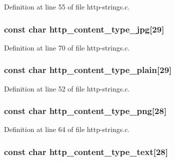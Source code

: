 Definition at line 55 of file http-\/strings.c.

\hypertarget{http-strings_8h_a34bd96a209a37f4b16744500510c50a0}{
\subsubsection[{http\_\-content\_\-type\_\-jpg}]{\setlength{\rightskip}{0pt plus 5cm}const char {\bf http\_\-content\_\-type\_\-jpg}\mbox{[}29\mbox{]}}}
\label{http-strings_8h_a34bd96a209a37f4b16744500510c50a0}


Definition at line 70 of file http-\/strings.c.

\hypertarget{http-strings_8h_a93ca46951cc4842f1abde782f3d2358d}{
\subsubsection[{http\_\-content\_\-type\_\-plain}]{\setlength{\rightskip}{0pt plus 5cm}const char {\bf http\_\-content\_\-type\_\-plain}\mbox{[}29\mbox{]}}}
\label{http-strings_8h_a93ca46951cc4842f1abde782f3d2358d}


Definition at line 52 of file http-\/strings.c.

\hypertarget{http-strings_8h_a371c581997fc6a5803c3551e33be77db}{
\subsubsection[{http\_\-content\_\-type\_\-png}]{\setlength{\rightskip}{0pt plus 5cm}const char {\bf http\_\-content\_\-type\_\-png}\mbox{[}28\mbox{]}}}
\label{http-strings_8h_a371c581997fc6a5803c3551e33be77db}


Definition at line 64 of file http-\/strings.c.

\hypertarget{http-strings_8h_aed57746b7fb18ac9361cfa7dc05c9782}{
\subsubsection[{http\_\-content\_\-type\_\-text}]{\setlength{\rightskip}{0pt plus 5cm}const char {\bf http\_\-content\_\-type\_\-text}\mbox{[}28\mbox{]}}}
\label{http-strings_8h_aed57746b7fb18ac9361cfa7dc05c9782}


